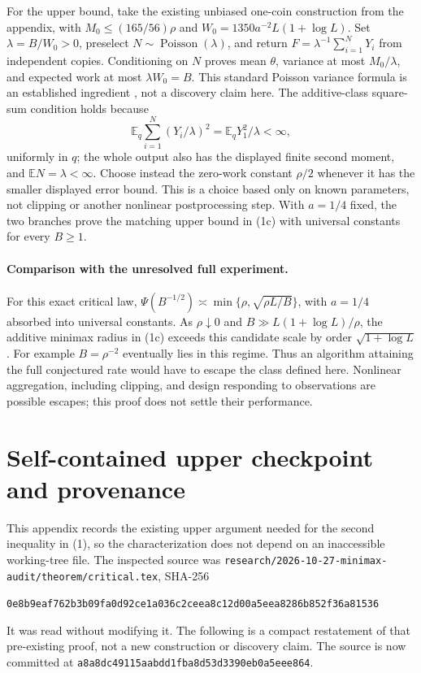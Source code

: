 \documentclass[11pt]{article}
\newcommand{\E}{\mathbb E}
\begin{document}
For the upper bound, take the existing unbiased one-coin construction from
the appendix, with $M_0\le(165/56)\rho$ and
$W_0=1350a^{-2}L(1+\log L)$. Set $\lambda=B/W_0>0$,
preselect $N\sim\operatorname{Poisson}(\lambda)$, and return
$F=\lambda^{-1}\sum_{i=1}^NY_i$ from independent copies.
Conditioning on $N$ proves mean $\theta$, variance at most $M_0/\lambda$,
and expected work at most $\lambda W_0=B$.
This standard Poisson variance formula is an established ingredient
\cite[Example 8]{vihola}, not a discovery claim here.
The additive-class square-sum condition holds because
\[
 \E_q\sum_{i=1}^N(Y_i/\lambda)^2=\E_qY_1^2/\lambda<\infty,
\]
uniformly in $q$; the whole output also has the displayed finite second
moment, and $\E N=\lambda<\infty$.
Choose instead the zero-work constant $\rho/2$ whenever it has the smaller
displayed error bound. This is a choice based only on known parameters,
not clipping or another nonlinear postprocessing step. With $a=1/4$ fixed,
the two branches prove the matching upper bound in (1c) with universal
constants for every $B\ge1$.

\paragraph{Comparison with the unresolved full experiment.}
For this exact critical law,
$\Psi(B^{-1/2})\asymp\min\{\rho,\sqrt{\rho L/B}\}$, with $a=1/4$
absorbed into universal constants. As $\rho\downarrow0$ and
$B\gg L(1+\log L)/\rho$, the additive minimax radius in (1c) exceeds this
candidate scale by order $\sqrt{1+\log L}$. For example $B=\rho^{-2}$
eventually lies in this regime. Thus an algorithm attaining the full
conjectured rate would have to escape the class defined here. Nonlinear
aggregation, including clipping, and design responding to observations
are possible escapes; this proof does not settle their performance.

\appendix
\section{Self-contained upper checkpoint and provenance}
This appendix records the existing upper argument needed for the second
inequality in (1), so the characterization does not depend on an inaccessible
working-tree file. The inspected source was
\texttt{research/2026-10-27-minimax-audit/theorem/critical.tex}, SHA-256
\begin{center}\small\texttt{0e8b9eaf762b3b09fa0d92ce1a036c2ceea8c12d00a5eea8286b852f36a81536}\end{center}
It was read without modifying it. The following is a compact restatement of
that pre-existing proof, not a new construction or discovery claim.
The source is now committed at
\texttt{a8a8dc49115aabdd1fba8d53d3390eb0a5eee864}.
\end{document}
